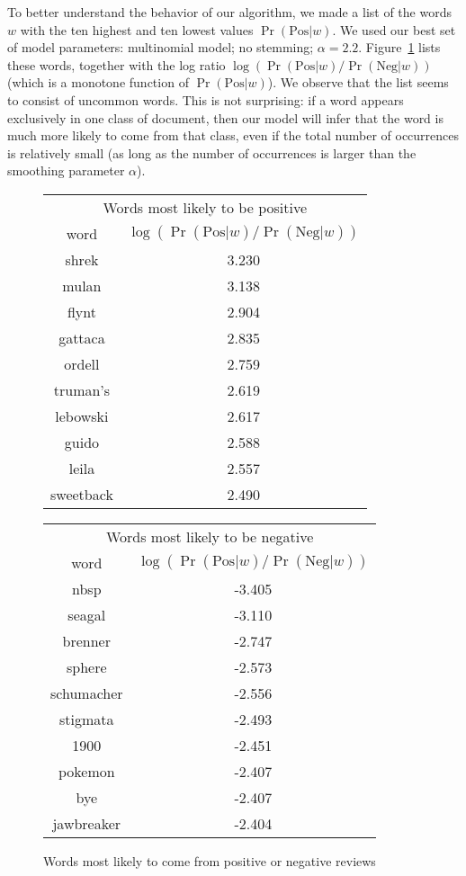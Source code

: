 \documentclass{article}
\newcommand{\PosC}{\mathrm{Pos}}
\newcommand{\NegC}{\mathrm{Neg}}
\begin{document}
To better understand the behavior of our algorithm, we made a list of the words \(w\) with the ten highest and ten lowest values \(\Pr(\PosC|w)\).
We used our best set of model parameters: multinomial model; no stemming; \(\alpha=2.2\).
Figure~\ref{fig:HighestWeightWords} lists these words, together with the log ratio \(\log(\Pr(\PosC|w) / \Pr(\NegC|w))\) (which is a monotone function of \(\Pr(\PosC|w)\)).
We observe that the list seems to consist of uncommon words.
This is not surprising: if a word appears exclusively in one class of document, then our model will infer that the word is much more likely to come from that class, even if the total number of occurrences is relatively small (as long as the number of occurrences is larger than the smoothing parameter \(\alpha\)).

\begin{figure}
\begin{tabular}{c|c}
    \multicolumn{2}{c}{Words most likely to be positive} \\
    word & \(\log(\Pr(\PosC|w) / \Pr(\NegC|w))\) \\
    \hline
    shrek & 3.230 \\
    mulan & 3.138 \\
    flynt & 2.904 \\
    gattaca & 2.835 \\
    ordell & 2.759 \\
    truman's & 2.619 \\
    lebowski & 2.617 \\
    guido & 2.588 \\
    leila & 2.557 \\
    sweetback & 2.490
\end{tabular}
\begin{tabular}{c|c}
    \multicolumn{2}{c}{Words most likely to be negative} \\
    word & \(\log(\Pr(\PosC|w) / \Pr(\NegC|w))\) \\
    \hline
    nbsp & -3.405 \\
    seagal & -3.110 \\
    brenner & -2.747 \\
    sphere & -2.573 \\
    schumacher & -2.556 \\
    stigmata & -2.493 \\
    1900 & -2.451 \\
    pokemon & -2.407 \\
    bye & -2.407 \\
    jawbreaker & -2.404
\end{tabular}
\caption{\label{fig:HighestWeightWords} Words most likely to come from positive or negative reviews}
\end{figure}
\end{document}
